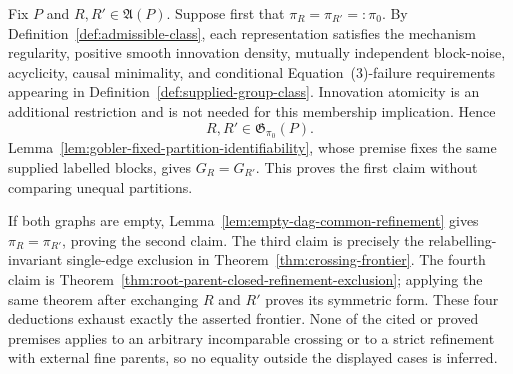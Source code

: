 Fix \(P\) and \(R,R'\in\mathfrak A(P)\).  Suppose first that
\(\pi_R=\pi_{R'}=: \pi_0\).  By
Definition~\ref{def:admissible-class}, each representation satisfies the
mechanism regularity, positive smooth innovation density, mutually independent
block-noise, acyclicity, causal minimality, and conditional Equation~(3)-failure
requirements appearing in Definition~\ref{def:supplied-group-class}.
Innovation atomicity is an additional restriction and is not needed for this
membership implication.  Hence
\[
 R,R'\in\mathfrak G_{\pi_0}(P).
\]
Lemma~\ref{lem:gobler-fixed-partition-identifiability}, whose premise fixes the
same supplied labelled blocks, gives \(G_R=G_{R'}\).  This proves the first
claim without comparing unequal partitions.

If both graphs are empty, Lemma~\ref{lem:empty-dag-common-refinement} gives
\(\pi_R=\pi_{R'}\), proving the second claim.  The third claim is precisely the
relabelling-invariant single-edge exclusion in
Theorem~\ref{thm:crossing-frontier}.  The fourth claim is
Theorem~\ref{thm:root-parent-closed-refinement-exclusion}; applying the same
theorem after exchanging \(R\) and \(R'\) proves its symmetric form.  These
four deductions exhaust exactly the asserted frontier.  None of the cited or
proved premises applies to an arbitrary incomparable crossing or to a strict
refinement with external fine parents, so no equality outside the displayed
cases is inferred.
